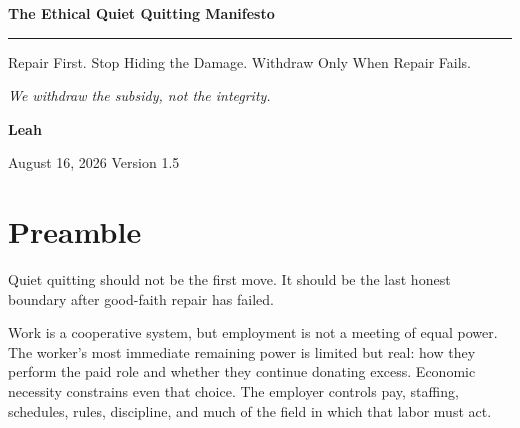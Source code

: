 \documentclass[11pt,oneside]{article}
\begin{document}
\hypersetup{pageanchor=false}

\begin{titlepage}
\thispagestyle{empty}
\vspace*{0.9in}

{\sffamily\bfseries\fontsize{31}{36}\selectfont\color{ManifestInk}
The Ethical Quiet Quitting Manifesto\par}

\vspace{0.5em}
{\color{ManifestRule}\rule{\textwidth}{1.2pt}}
\vspace{1.0em}

{\sffamily\fontsize{17}{23}\selectfont\color{ManifestGray}
Repair First. Stop Hiding the Damage. Withdraw Only When Repair
Fails.\par}

\vfill

\begin{tcolorbox}[
  enhanced,
  colback=ManifestLight,
  colframe=ManifestRule,
  boxrule=0pt,
  leftrule=4pt,
  arc=0pt,
  left=14pt,right=14pt,top=13pt,bottom=13pt
]
{\Large\itshape We withdraw the subsidy, not the integrity.}
\end{tcolorbox}
\vfill

{\sffamily\large\bfseries Leah\par}
\vspace{0.2em}
{\sffamily\color{ManifestGray}August 16, 2026 \quad Version 1.5\par}
\vspace{0.55in}
\end{titlepage}

\thispagestyle{plain}
\tableofcontents
\clearpage
{}
\hypersetup{pageanchor=true}

\hypertarget{preamble}{%
\section{Preamble}\label{preamble}}

Quiet quitting should not be the first move. It should be the last
honest boundary after good-faith repair has failed.

Work is a cooperative system, but employment is not a meeting of equal
power. The worker's most immediate remaining power is limited but real:
how they perform the paid role and whether they continue donating
excess. Economic necessity constrains even that choice. The employer
controls pay, staffing, schedules, rules, discipline, and much of the
field in which that labor must act.
\end{document}

